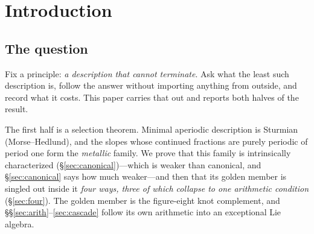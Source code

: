 \documentclass[11pt,reqno]{amsart}
\theoremstyle{plain}
\theoremstyle{definition}
\theoremstyle{remark}
\newcommand{\sll}{\mathfrak{sl}}
\newcommand{\ee}{\mathfrak{e}}
\begin{document}
\begin{abstract}
{performs the embedding}: it locates $A_4$, and the proposition says what a standard
embedding inside it yields. And the $26$-points, like the terminal $14$-point, are
\textbf{not real}, so the compact groups the proposition names are not supplied by
anything in this paper---which does not treat real forms. What the stratum establishes is
therefore an \emph{availability}, not a further link in the chain.
\textbf{We state plainly what the field computation does and does not
depend on}: $K$, the four invariant degrees, and the whole rung ladder are invariants of
the triple $(\ee_6,\,2T,\,\text{principal }\sll_2)$ and \emph{not} of the figure-eight
knot. Anything reaching $2T$ through the principal $\sll_2$ meets the same cubic. The
manifold's arithmetic is consumed at the entrance, once, and nothing downstream
remembers which manifold it was.

\textbf{We report the ceiling with equal weight}, because it is a theorem about the
method and not a limit of effort: every centralizer of a subset of $C$ contains a Cartan
subalgebra, so \textbf{every rung has rank $6$}. Measurement preserves rank, and any
target of lower rank is therefore unreachable by any sequence of measurements. Descending
in rank would require an operation the object does not supply. We make no physical
identification, and we do not treat real forms.
\end{abstract}

\maketitle
\tableofcontents

\section{Introduction}\label{sec:intro}

\subsection{The question}
Fix a principle: \emph{a description that cannot terminate}. Ask what the least such
description is, follow the answer without importing anything from outside, and record
what it costs. This paper carries that out and reports both halves of the result.

The first half is a selection theorem. Minimal aperiodic description is Sturmian
(Morse--Hedlund), and the slopes whose continued fractions are purely periodic of
period one form the \emph{metallic} family. We prove that this family is intrinsically
characterized (\S\ref{sec:canonical})---which is weaker than canonical, and \S\ref{sec:canonical}
says how much weaker---and then that its golden member is singled out inside it
\emph{four ways, three of which collapse to one arithmetic condition}
(\S\ref{sec:four}). The golden member is the figure-eight
knot complement, and \S\S\ref{sec:arith}--\ref{sec:cascade} follow its own arithmetic
into an exceptional Lie algebra.
\end{document}
